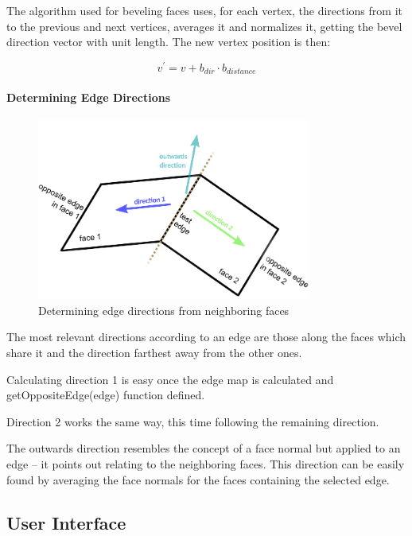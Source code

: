 The algorithm used for beveling faces uses, for each vertex,
the directions from it to the previous and next vertices,
averages it and normalizes it, getting the bevel direction vector with unit length.
The new vertex position is then:

\begin{equation}
	v^{'} = v + b_{dir} \cdot b_{distance}
\end{equation}


\paragraph{Determining Edge Directions}

\begin{figure}[!ht]
    \centering
    \includegraphics[width=9cm]{gfx/face-dirs.png}
    \vspace{-0.5cm}
    \caption{Determining edge directions from neighboring faces}
    \label{FIG-GS-FACE-DIRS}
\end{figure}

The most relevant directions according to an edge are those along the faces
which share it and the direction farthest away from the other ones.
 
Calculating direction 1 is easy once the edge map is calculated
and getOppositeEdge(edge) function defined.

Direction 2 works the same way, this time following the remaining direction.

The outwards direction resembles the concept of a face normal but applied to an edge
-- it points out relating to the neighboring faces.
This direction can be easily found by averaging the face normals
for the faces containing the selected edge.


\subsection{User Interface}

